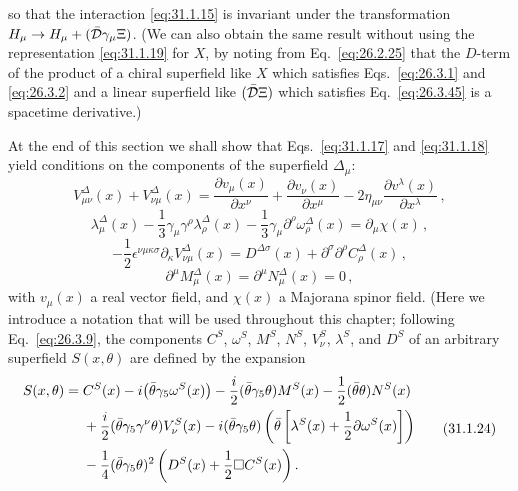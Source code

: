 so that the interaction \eqref{eq:31.1.15} is invariant under the
transformation
\(H_\mu\to H_\mu+(\bar{\mathcal{D}}\gamma_\mu\Xi)\). (We can also obtain the same
result without using the representation \eqref{eq:31.1.19} for \(X\), by
noting from Eq.~\eqref{eq:26.2.25} that the \(D\)-term of the product of a
chiral superfield like \(X\) which satisfies Eqs.~\eqref{eq:26.3.1} and
\eqref{eq:26.3.2} and a linear superfield like
\((\bar{\mathcal{D}}\Xi)\) which satisfies Eq.~\eqref{eq:26.3.45} is a spacetime
derivative.)

At the end of this section we shall show that Eqs.~\eqref{eq:31.1.17} and
\eqref{eq:31.1.18} yield conditions on the components of the superfield
\(\Delta_\mu\):
\begin{equation}
  V_{\mu\nu}^\Delta(x)+V_{\nu\mu}^\Delta(x)
  =\frac{\partial v_\mu(x)}{\partial x^\nu}
   +\frac{\partial v_\nu(x)}{\partial x^\mu}
   -2\eta_{\mu\nu}\frac{\partial v^\lambda(x)}{\partial x^\lambda}\,,
  \tag{31.1.20}\label{eq:31.1.20}
\end{equation}
\begin{equation}
  \lambda_\mu^\Delta(x)
  -\frac13\gamma_\mu\gamma^\rho\lambda_\rho^\Delta(x)
  -\frac13\gamma_\mu\partial^\rho\omega_\rho^\Delta(x)
  =\partial_\mu\chi(x)\,,
  \tag{31.1.21}\label{eq:31.1.21}
\end{equation}
\begin{equation}
  -\frac12\epsilon^{\nu\mu\kappa\sigma}
    \partial_\kappa V_{\nu\mu}^\Delta(x)
  =D^{\Delta\sigma}(x)+\partial^\sigma\partial^\rho C_\rho^\Delta(x)\,,
  \tag{31.1.22}\label{eq:31.1.22}
\end{equation}
\begin{equation}
  \partial^\mu M_\mu^\Delta(x)
  =\partial^\mu N_\mu^\Delta(x)=0\,,
  \tag{31.1.23}\label{eq:31.1.23}
\end{equation}
with \(v_\mu(x)\) a real vector field, and \(\chi(x)\) a Majorana spinor
field. (Here we introduce a notation that will be used throughout this
chapter; following Eq.~\eqref{eq:26.3.9}, the components \(C^S\),
\(\omega^S\), \(M^S\), \(N^S\), \(V_\nu^S\), \(\lambda^S\), and \(D^S\) of
an arbitrary superfield \(S(x,\theta)\) are defined by the expansion
\begin{equation}
  \begin{aligned}
  S(x,\theta)={}&C^S(x)-i\bigl(\bar\theta\gamma_5\omega^S(x)\bigr)
  -\frac{i}{2}(\bar\theta\gamma_5\theta)M^S(x)
  -\frac12(\bar\theta\theta)N^S(x)
  \\
  &+\frac{i}{2}(\bar\theta\gamma_5\gamma^\nu\theta)V_\nu^S(x)
  -i(\bar\theta\gamma_5\theta)
    \left(\bar\theta\left[
      \lambda^S(x)+\frac12\sl{\partial}\omega^S(x)
    \right]\right)
  \\
  &-\frac14(\bar\theta\gamma_5\theta)^2
    \left(D^S(x)+\frac12\Box C^S(x)\right).
  \end{aligned}
  \tag{31.1.24}\label{eq:31.1.24}
\end{equation}
